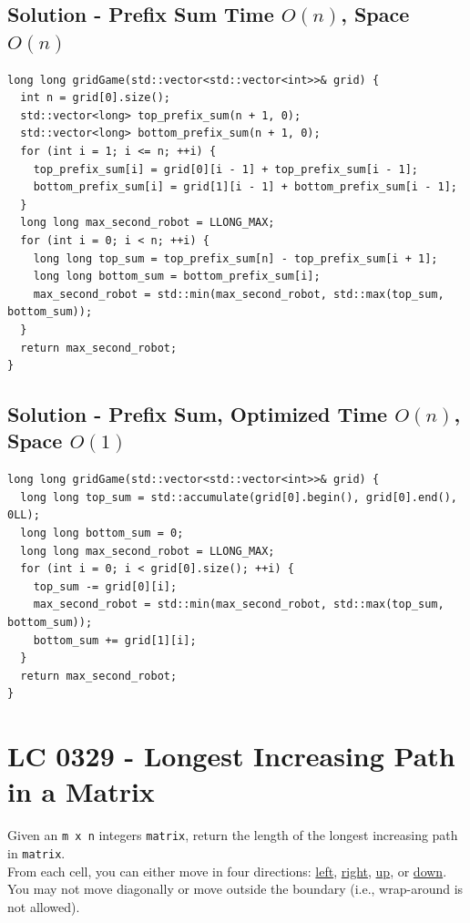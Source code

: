 \subsection*{Solution - Prefix Sum {\scriptsize\color{gray}\Coffeecup\hspace{1mm}Time $O(n)$, Space $O(n)$}}
\begin{lstlisting}
long long gridGame(std::vector<std::vector<int>>& grid) {
  int n = grid[0].size();
  std::vector<long> top_prefix_sum(n + 1, 0);
  std::vector<long> bottom_prefix_sum(n + 1, 0);
  for (int i = 1; i <= n; ++i) {
    top_prefix_sum[i] = grid[0][i - 1] + top_prefix_sum[i - 1];
    bottom_prefix_sum[i] = grid[1][i - 1] + bottom_prefix_sum[i - 1];
  }
  long long max_second_robot = LLONG_MAX;
  for (int i = 0; i < n; ++i) {
    long long top_sum = top_prefix_sum[n] - top_prefix_sum[i + 1];
    long long bottom_sum = bottom_prefix_sum[i];
    max_second_robot = std::min(max_second_robot, std::max(top_sum, bottom_sum));
  }
  return max_second_robot;
}
\end{lstlisting}

\subsection*{Solution - Prefix Sum, Optimized {\scriptsize\color{gray}\Coffeecup\hspace{1mm}Time $O(n)$, Space $O(1)$}}
\begin{lstlisting}
long long gridGame(std::vector<std::vector<int>>& grid) {
  long long top_sum = std::accumulate(grid[0].begin(), grid[0].end(), 0LL);
  long long bottom_sum = 0;
  long long max_second_robot = LLONG_MAX;
  for (int i = 0; i < grid[0].size(); ++i) {
    top_sum -= grid[0][i];
    max_second_robot = std::min(max_second_robot, std::max(top_sum, bottom_sum));
    bottom_sum += grid[1][i];
  }
  return max_second_robot;
}
\end{lstlisting}

\section{LC 0329 - Longest Increasing Path in a Matrix}
Given an {\colorbox{CodeBackground}{\lstinline|m x n|}} integers {\colorbox{CodeBackground}{\lstinline|matrix|}}, return the length of the longest increasing path in {\colorbox{CodeBackground}{\lstinline|matrix|}}.\\

From each cell, you can either move in four directions: \ul{left}, \ul{right}, \ul{up}, or \ul{down}. You may not move diagonally or move outside the boundary (i.e., wrap-around is not allowed).\\

